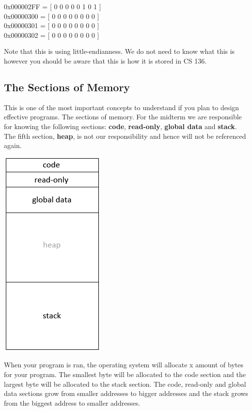 \documentclass[12pt,extarticle]{article}
\begin{document}
\begin{center}
0x000002FF = [ 0 0 0 0 0 1 0 1 ]\\
0x00000300 = [ 0 0 0 0 0 0 0 0 ]\\
0x00000301 = [ 0 0 0 0 0 0 0 0 ]\\
0x00000302 = [ 0 0 0 0 0 0 0 0 ]\\
\end{center}

Note that this is using little-endianness. We do not need to know what this is however you should be aware that this is how it is stored in CS 136.

\subsection{The Sections of Memory}

This is one of the most important concepts to understand if you plan to design effective programs. The sections of memory. For the midterm we are responsible for knowing the following sections: \textbf{code}, \textbf{read-only}, \textbf{global data} and \textbf{stack}. The fifth section, \textbf{heap}, is not our responsibility and hence will not be referenced again.\\

\begin{center}
\includegraphics[scale=0.30]{memory_sections.png}
\end{center}

When your program is ran, the operating system will allocate x amount of bytes for your program. The smallest byte will be allocated to the code section and the largest byte will be allocated to the stack section. The code, read-only and global data sections grow from smaller addresses to bigger addresses and the stack grows from the biggest address to smaller addresses.\\
\end{document}

